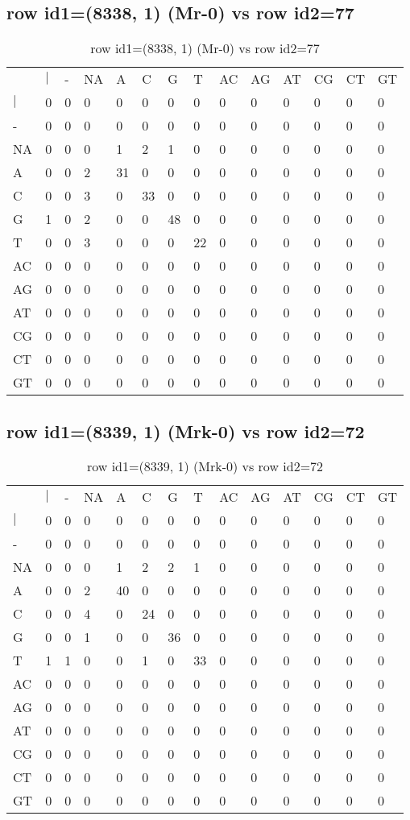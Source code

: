 \subsection{row id1=(8338, 1) (Mr-0) vs row id2=77}
\begin{center}
\begin{longtable}{|l|l|l|l|l|l|l|l|l|l|l|l|l|l|}
\caption{row id1=(8338, 1) (Mr-0) vs row id2=77} \label{table_dm342}\\
\hline
\\
\hline
&$|$&-&NA&A&C&G&T&AC&AG&AT&CG&CT&GT\\
$|$&0&0&0&0&0&0&0&0&0&0&0&0&0\\
-&0&0&0&0&0&0&0&0&0&0&0&0&0\\
NA&0&0&0&1&2&1&0&0&0&0&0&0&0\\
A&0&0&2&31&0&0&0&0&0&0&0&0&0\\
C&0&0&3&0&33&0&0&0&0&0&0&0&0\\
G&1&0&2&0&0&48&0&0&0&0&0&0&0\\
T&0&0&3&0&0&0&22&0&0&0&0&0&0\\
AC&0&0&0&0&0&0&0&0&0&0&0&0&0\\
AG&0&0&0&0&0&0&0&0&0&0&0&0&0\\
AT&0&0&0&0&0&0&0&0&0&0&0&0&0\\
CG&0&0&0&0&0&0&0&0&0&0&0&0&0\\
CT&0&0&0&0&0&0&0&0&0&0&0&0&0\\
GT&0&0&0&0&0&0&0&0&0&0&0&0&0\\
\hline
\end{longtable}
\end{center}

\subsection{row id1=(8339, 1) (Mrk-0) vs row id2=72}
\begin{center}
\begin{longtable}{|l|l|l|l|l|l|l|l|l|l|l|l|l|l|}
\caption{row id1=(8339, 1) (Mrk-0) vs row id2=72} \label{table_dm344}\\
\hline
\\
\hline
&$|$&-&NA&A&C&G&T&AC&AG&AT&CG&CT&GT\\
$|$&0&0&0&0&0&0&0&0&0&0&0&0&0\\
-&0&0&0&0&0&0&0&0&0&0&0&0&0\\
NA&0&0&0&1&2&2&1&0&0&0&0&0&0\\
A&0&0&2&40&0&0&0&0&0&0&0&0&0\\
C&0&0&4&0&24&0&0&0&0&0&0&0&0\\
G&0&0&1&0&0&36&0&0&0&0&0&0&0\\
T&1&1&0&0&1&0&33&0&0&0&0&0&0\\
AC&0&0&0&0&0&0&0&0&0&0&0&0&0\\
AG&0&0&0&0&0&0&0&0&0&0&0&0&0\\
AT&0&0&0&0&0&0&0&0&0&0&0&0&0\\
CG&0&0&0&0&0&0&0&0&0&0&0&0&0\\
CT&0&0&0&0&0&0&0&0&0&0&0&0&0\\
GT&0&0&0&0&0&0&0&0&0&0&0&0&0\\
\hline
\end{longtable}
\end{center}

